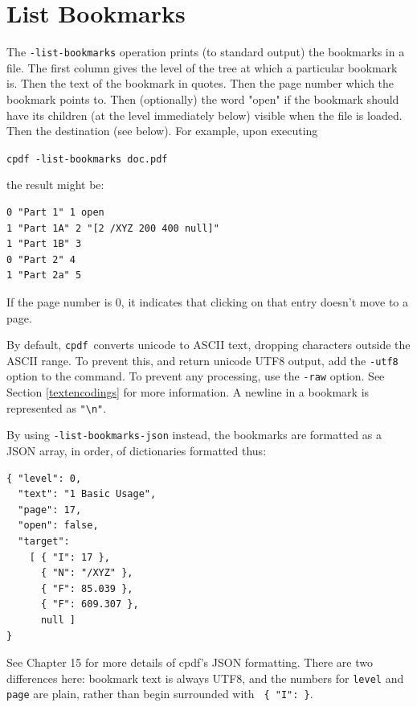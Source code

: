 \documentclass{book}
\newcommand{\cpdf}{\texttt{cpdf}}
\begin{document}
  \section{List Bookmarks}
  The \texttt{-list-bookmarks} operation prints (to standard output) the
bookmarks in a file. The first column gives the level of the tree at which a
particular bookmark is. Then the text of the bookmark in quotes. Then the page
number which the bookmark points to. Then (optionally) the word "open" if the
bookmark should have its children (at the level immediately below) visible when
the file is loaded. Then the destination (see below). For example, upon executing
\begin{framed}
  \noindent\small\verb!cpdf -list-bookmarks doc.pdf!
\end{framed}

\noindent the result might be:
\begin{framed}{\small\begin{verbatim}
0 "Part 1" 1 open
1 "Part 1A" 2 "[2 /XYZ 200 400 null]"
1 "Part 1B" 3
0 "Part 2" 4
1 "Part 2a" 5\end{verbatim}}\end{framed}
\noindent If the page number is 0, it indicates that clicking on that entry doesn't move to a page.

By default, \cpdf\ converts unicode to ASCII text, dropping characters outside
the ASCII range. To prevent this, and return unicode UTF8 output, add the
\texttt{-utf8} option to the command. To prevent any processing, use the
\texttt{-raw} option. See Section \ref{textencodings} for more information. A newline in a bookmark is represented as \texttt{"\textbackslash n"}.

By using \texttt{-list-bookmarks-json} instead, the bookmarks are formatted as a JSON array, in order, of dictionaries formatted thus:

\begin{verbatim}
{ "level": 0,
  "text": "1 Basic Usage",
  "page": 17,
  "open": false,
  "target":
    [ { "I": 17 },
      { "N": "/XYZ" },
      { "F": 85.039 },
      { "F": 609.307 },
      null ]
}
\end{verbatim}

\noindent See Chapter 15 for more details of cpdf's JSON formatting. There are two differences here: bookmark text is always UTF8, and the numbers for \texttt{level} and \texttt{page} are plain, rather than begin surrounded with \texttt{ \{ "I": \}}.
\end{document}
